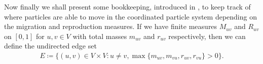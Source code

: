 \documentclass[11pt]{article}
\theoremstyle{definition}
\newcommand{\N}{\mathbb{N}}
\begin{document}

    



\noindent Now finally we shall present some bookkeeping, introduced in \cite{CPS2021}, to keep track of where particles are able to move in the coordinated particle system depending on the migration and reproduction measures. If we have finite measures $M_{uv}$ and $R_{uv}$ on $[0,1]$ for $u,v \in V$ with total masses $m_{uv}$ and $r_{uv}$ respectively, then we can define the undirected edge set
%
\begin{align*}
    E \coloneqq \{(u,v) \in V \times V \colon u \neq v, \max\{m_{uv}, m_{vu}, r_{uv}, r_{vu}\} > 0\}.
\end{align*}
\end{document}
